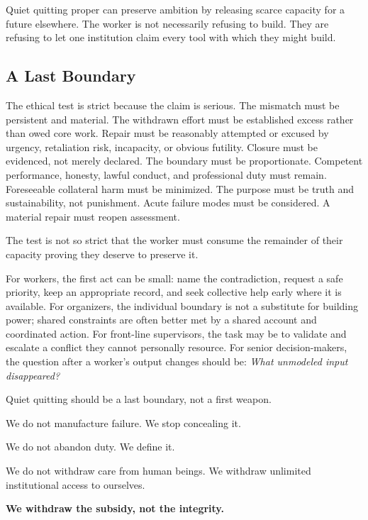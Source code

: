 \documentclass[12pt,oneside]{article}
\begin{document}
Quiet quitting proper can preserve ambition by releasing scarce capacity
for a future elsewhere. The worker is not necessarily refusing to build.
They are refusing to let one institution claim every tool with which
they might build.

\hypertarget{a-last-boundary}{%
\subsection{A Last Boundary}\label{a-last-boundary}}

The ethical test is strict because the claim is serious. The mismatch
must be persistent and material. The withdrawn effort must be
established excess rather than owed core work. Repair must be reasonably
attempted or excused by urgency, retaliation risk, incapacity, or
obvious futility. Closure must be evidenced, not merely declared. The
boundary must be proportionate. Competent performance, honesty, lawful
conduct, and professional duty must remain. Foreseeable collateral harm
must be minimized. The purpose must be truth and sustainability, not
punishment. Acute failure modes must be considered. A material repair
must reopen assessment.

The test is not so strict that the worker must consume the remainder of
their capacity proving they deserve to preserve it.

For workers, the first act can be small: name the contradiction, request
a safe priority, keep an appropriate record, and seek collective help
early where it is available. For organizers, the individual boundary is
not a substitute for building power; shared constraints are often better
met by a shared account and coordinated action. For front-line
supervisors, the task may be to validate and escalate a conflict they
cannot personally resource. For senior decision-makers, the question
after a worker's output changes should be: \emph{What unmodeled input
disappeared?}

Quiet quitting should be a last boundary, not a first weapon.

We do not manufacture failure. We stop concealing it.

We do not abandon duty. We define it.

We do not withdraw care from human beings. We withdraw unlimited
institutional access to ourselves.

\textbf{We withdraw the subsidy, not the integrity.}

\clearpage
\begingroup
\sloppy
\theendnotes
\endgroup
\end{document}
